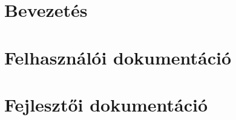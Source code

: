 \documentclass[twoside, 12pt]{article}
\begin{document}




\tableofcontents\newpage

\part{Bevezetés}



\part{Felhasználói dokumentáció}





\part{Fejlesztői dokumentáció}










\end{document}
